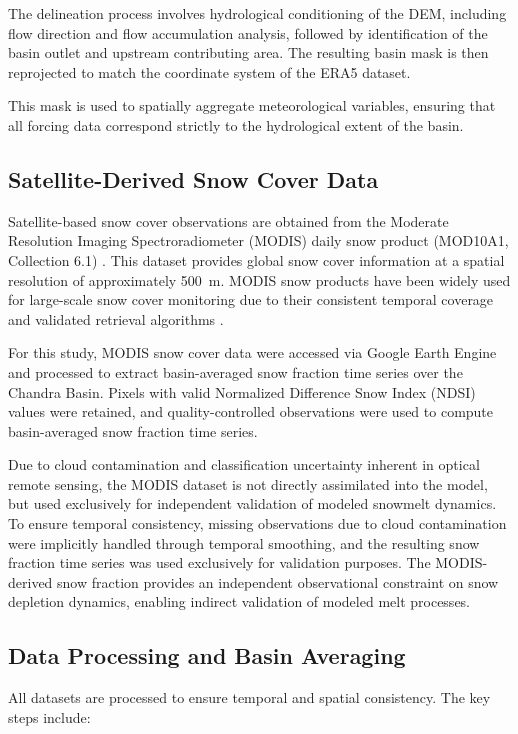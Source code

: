 \documentclass[11pt]{article}
\begin{document}
The delineation process involves hydrological conditioning of the DEM, including flow direction and flow accumulation analysis, followed by identification of the basin outlet and upstream contributing area. The resulting basin mask is then reprojected to match the coordinate system of the ERA5 dataset.

This mask is used to spatially aggregate meteorological variables, ensuring that all forcing data correspond strictly to the hydrological extent of the basin.

\subsection{Satellite-Derived Snow Cover Data}

Satellite-based snow cover observations are obtained from the Moderate Resolution Imaging Spectroradiometer (MODIS) daily snow product (MOD10A1, Collection 6.1) \citep{Hall2002}. This dataset provides global snow cover information at a spatial resolution of approximately 500~m. MODIS snow products have been widely used for large-scale snow cover monitoring due to their consistent temporal coverage and validated retrieval algorithms \citep{hall2019}.

For this study, MODIS snow cover data were accessed via Google Earth Engine and processed to extract basin-averaged snow fraction time series over the Chandra Basin. Pixels with valid Normalized Difference Snow Index (NDSI) values were retained, and quality-controlled observations were used to compute basin-averaged snow fraction time series.

Due to cloud contamination and classification uncertainty inherent in optical remote sensing, the MODIS dataset is not directly assimilated into the model, but used exclusively for independent validation of modeled snowmelt dynamics. To ensure temporal consistency, missing observations due to cloud contamination were implicitly handled through temporal smoothing, and the resulting snow fraction time series was used exclusively for validation purposes. The MODIS-derived snow fraction provides an independent observational constraint on snow depletion dynamics, enabling indirect validation of modeled melt processes.

\subsection{Data Processing and Basin Averaging}

All datasets are processed to ensure temporal and spatial consistency. The key steps include:
\end{document}

